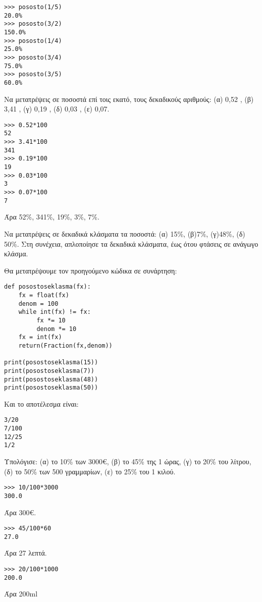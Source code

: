 \begin{lstlisting}
>>> pososto(1/5)
20.0%
>>> pososto(3/2)
150.0%
>>> pososto(1/4)
25.0%
>>> pososto(3/4)
75.0%
>>> pososto(3/5)
60.0%
\end{lstlisting}
\begin{exercise}
Να  μετατρέψεις σε  ποσοστά επί τοις    εκατό,  τους    δεκαδικούς  αριθμούς:
(α) 0,52    ,           (β) 3,41    ,           (γ) 0,19    ,           (δ) 0,03    ,           (ε) 0,07.
\end{exercise}
\begin{lstlisting}
>>> 0.52*100
52
>>> 3.41*100
341
>>> 0.19*100
19
>>> 0.03*100
3
>>> 0.07*100
7
\end{lstlisting}
Άρα 52\%, 341\%, 19\%, 3\%, 7\%.
\begin{exercise}
Να  μετατρέψεις σε  δεκαδικά    κλάσματα    τα  ποσοστά:    (α) 15\%,    (β)7\%,  (γ)48\%, (δ) 50\%.    Στη 
συνέχεια,   απλοποίησε  τα  δεκαδικά    κλάσματα,   έως ότου    φτάσεις σε  ανάγωγο κλάσμα.
\end{exercise}
Θα μετατρέψουμε τον προηγούμενο κώδικα σε συνάρτηση:
\begin{lstlisting}
def posostoseklasma(fx):
    fx = float(fx)
    denom = 100
    while int(fx) != fx:
         fx *= 10
         denom *= 10
    fx = int(fx)
    return(Fraction(fx,denom))

print(posostoseklasma(15))
print(posostoseklasma(7))
print(posostoseklasma(48))
print(posostoseklasma(50))
\end{lstlisting}
Και το αποτέλεσμα είναι:
\begin{lstlisting}
3/20
7/100
12/25
1/2
\end{lstlisting}

\begin{exercise}
Υπολόγισε:  (α) το  10\% των 3000€,  (β) το  45\% της 1   ώρας,   (γ) το  20\% του λίτρου,
(δ) το  50\% των 500 γραμμαρίων, (ε) το  25\% του 1   κιλού.
\end{exercise}
\begin{lstlisting}
>>> 10/100*3000
300.0
\end{lstlisting}
Άρα 300€.

\begin{lstlisting}
>>> 45/100*60
27.0
\end{lstlisting}
Άρα 27 λεπτά.

\begin{lstlisting}
>>> 20/100*1000
200.0
\end{lstlisting}
Άρα 200ml

